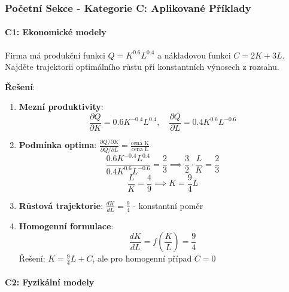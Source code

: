 \subsubsection{Početní Sekce - Kategorie C: Aplikované Příklady}
\label{subsubsec:pocetni-kategorie-c}

\paragraph*{C1: Ekonomické modely}

\begin{example}
Firma má produkční funkci $Q = K^{0.6}L^{0.4}$ a nákladovou funkci $C = 2K + 3L$. Najděte trajektorii optimálního růstu při konstantních výnosech z rozsahu.
\vspace{0.3\baselineskip}

\textbf{Řešení}: 
\begin{enumerate}
\item \textbf{Mezní produktivity}:
\[
\frac{\partial Q}{\partial K} = 0.6K^{-0.4}L^{0.4}, \quad \frac{\partial Q}{\partial L} = 0.4K^{0.6}L^{-0.6}
\]

\item \textbf{Podmínka optima}: $\frac{\partial Q/\partial K}{\partial Q/\partial L} = \frac{\text{cena K}}{\text{cena L}}$
\[
\frac{0.6K^{-0.4}L^{0.4}}{0.4K^{0.6}L^{-0.6}} = \frac{2}{3} \implies \frac{3}{2}\cdot\frac{L}{K} = \frac{2}{3}
\]
\[
\frac{L}{K} = \frac{4}{9} \implies K = \frac{9}{4}L
\]

\item \textbf{Růstová trajektorie}: $\frac{dK}{dL} = \frac{9}{4}$ - konstantní poměr

\item \textbf{Homogenní formulace}: 
\[
\frac{dK}{dL} = f\left(\frac{K}{L}\right) = \frac{9}{4}
\]
Řešení: $K = \frac{9}{4}L + C$, ale pro homogenní případ $C = 0$
\end{enumerate}
\end{example}

\vspace{0.8\baselineskip}

\paragraph*{C2: Fyzikální modely}


